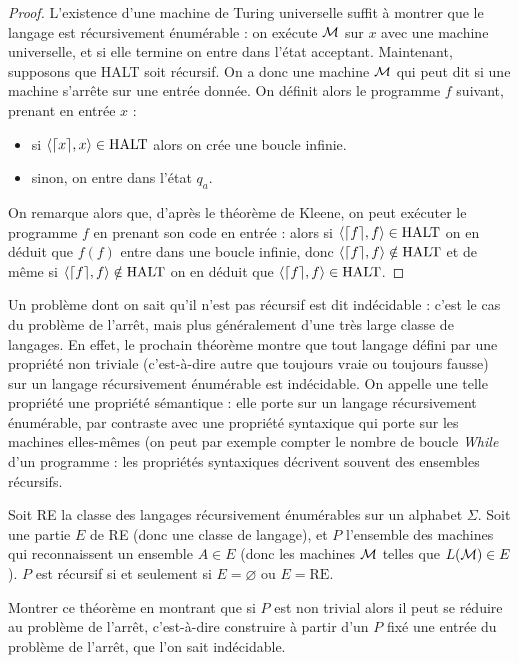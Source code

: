 \begin{proof}
    L'existence d'une machine de Turing universelle suffit à montrer que le langage est récursivement énumérable : on exécute $\mathcal M$ sur $x$ avec une machine universelle, et si elle termine on entre dans l'état acceptant. Maintenant, supposons que HALT soit récursif. On a donc une machine $\mathcal M$ qui peut dit si une machine s'arrête sur une entrée donnée. On définit alors le programme $f$ suivant, prenant en entrée $x$ :
    \begin{itemize}[label=$\bullet$]
        \item si $\langle \lceil x \rceil,x\rangle\in\mathrm{HALT}$ alors on crée une boucle infinie.
        \item sinon, on entre dans l'état $q_a$.
    \end{itemize}
    On remarque alors que, d'après le théorème de Kleene, on peut exécuter le programme $f$ en prenant son code en entrée : alors si $\langle \lceil f \rceil,f\rangle \in\mathrm{HALT}$ on en déduit que $f(f)$ entre dans une boucle infinie, donc $\langle \lceil f \rceil,f\rangle \notin\mathrm{HALT}$ et de même si $\langle \lceil f \rceil,f\rangle\notin\mathrm{HALT}$ on en déduit que $\langle\lceil f \rceil,f\rangle\in\mathrm{HALT}$.
\end{proof}

Un problème dont on sait qu'il n'est pas récursif est dit indécidable : c'est le cas du problème de l'arrêt, mais plus généralement d'une très large classe de langages. En effet, le prochain théorème montre que tout langage défini par une propriété non triviale (c'est-à-dire autre que toujours vraie ou toujours fausse) sur un langage récursivement énumérable est indécidable. On appelle une telle propriété une propriété sémantique : elle porte sur un langage récursivement énumérable, par contraste avec une propriété syntaxique qui porte sur les machines elles-mêmes (on peut par exemple compter le nombre de boucle \textit{While} d'un programme : les propriétés syntaxiques décrivent souvent des ensembles récursifs.

\begin{them}[Rice]
    Soit RE la classe des langages récursivement énumérables sur un alphabet $\Sigma$. Soit une partie $E$ de RE (donc une classe de langage), et $P$ l'ensemble des machines qui reconnaissent un ensemble $A\in E$ (donc les machines $\mathcal M$ telles que $L(\mathcal M)\in E$). $P$ est récursif si et seulement si $E=\varnothing$ ou $E=\mathrm{RE}$. 
\end{them}

\begin{exo}
    Montrer ce théorème en montrant que si $P$ est non trivial alors il peut se réduire au problème de l'arrêt, c'est-à-dire construire à partir d'un $P$ fixé une entrée du problème de l'arrêt, que l'on sait indécidable.
\end{exo}


